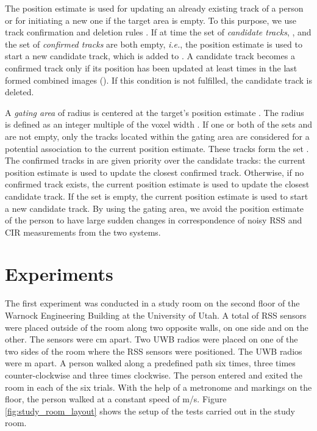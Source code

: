 \documentclass[conference]{IEEEtran}
\begin{document}
The position estimate  is used for updating an already
existing track of a person or for initiating a new one if the target
area is empty. To this purpose, we use track confirmation and deletion
rules \cite{blackman99}. If at time  the set of \emph{candidate
  tracks}, , and the set of \emph{confirmed tracks}
 are both empty, \emph{i.e.}, the position estimate
 is used to start a new candidate track, which is added to
. A candidate track becomes a confirmed track only if
its position has been updated at least  times in the last 
formed combined images (). If this condition is not
fulfilled, the candidate track is deleted.

A \emph{gating area} of radius  is centered at the target's
position estimate . The radius  is defined as an
integer multiple of the voxel width . If one or both of the sets
 and  are not empty, only the tracks
located within the gating area are considered for a potential
association to the current position estimate. These tracks form the
set . The
confirmed tracks in  are given priority over the
candidate tracks: the current position estimate is used to update the
closest confirmed track. Otherwise, if no confirmed track exists, the
current position estimate is used to update the closest candidate
track. If the set  is empty, the current position
estimate is used to start a new candidate track. By using the gating
area, we avoid the position estimate of the person to have large
sudden changes in correspondence of noisy RSS and CIR measurements
from the two systems.





\section{Experiments} \label{sec:experiments}

The first experiment was conducted in a study room on the second floor
of the Warnock Engineering Building at the University of Utah. A total
of  RSS sensors were placed outside of the room along two opposite
walls,  on one side and  on the other. The sensors were 
cm apart. Two UWB radios were placed on one of the two sides of the
room where the RSS sensors were positioned. The UWB radios were  m
apart. A person walked along a predefined path six times, three times
counter-clockwise and three times clockwise. The person entered and
exited the room in each of the six trials. With the help of a
metronome and markings on the floor, the person walked at a constant
speed of  m/s. Figure \ref{fig:study_room_layout} shows the setup
of the tests carried out in the study room.
\end{document}

